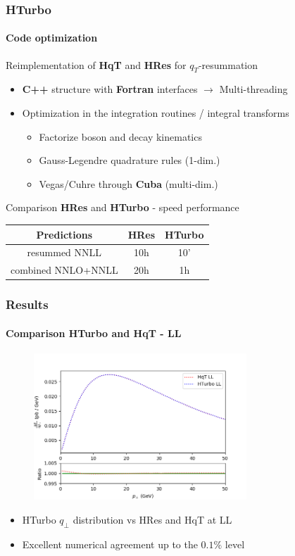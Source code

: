 \documentclass[aspectratio=43]{beamer}
\begin{document}
\begin{frame}

	\frametitle{HTurbo}
	\framesubtitle{Code optimization}
	
	Reimplementation of \textbf{HqT} and \textbf{HRes} for $q_{T}$-resummation
	\begin{itemize}
		\item \textbf{C++} structure with \textbf{Fortran} interfaces $\rightarrow$ Multi-threading
		\item Optimization in the integration routines / integral transforms 
		\begin{itemize}
			\item Factorize boson and decay kinematics
			\item Gauss-Legendre quadrature rules (1-dim.)
			\item Vegas/Cuhre through \textbf{Cuba} (multi-dim.)
		\end{itemize}
	\end{itemize}
	
	\vspace{0.5cm}
	
	Comparison \textbf{HRes} and \textbf{HTurbo} - speed performance \\
	\center
	\begin{tabular}{ | c | c | c | }
		\hline
		Predictions & \textbf{HRes} & \textbf{HTurbo} \\ 
		\hline
		resummed NNLL & 10h & 10' \\
		\hline
		combined NNLO+NNLL & 20h & 1h \\
		\hline
	\end{tabular}

	
\end{frame}

\begin{frame}
	
	\frametitle{Results}
	\framesubtitle{Comparison HTurbo and HqT - LL}
	
	\begin{figure}
		\includegraphics[width = 8cm]{plots/part3/hturbo_LL.png}
	\end{figure}
	
	\begin{itemize}
		\item HTurbo $q_{\perp}$ distribution vs HRes and HqT at LL
		\item Excellent numerical agreement up to the $0.1\%$ level
	\end{itemize}

\end{frame}
\end{document}
